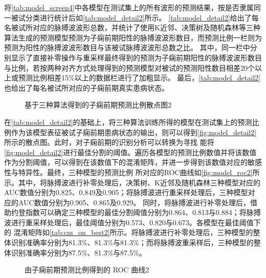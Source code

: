 将\autoref{tab:model_screen4}中各模型在测试集上的所有波形的预测结果，按是否隶属同一被试分类进行统计后如\autoref{tab:model_detail2}所示。
\autoref{tab:model_detail2}给出了每名被试所对应的脉搏波波形总数，并统计了使用K近邻、决策树及随机森林等三种算法生成的预测模型预测为子痫前期阳性的脉搏波波形数目，而预测比例一栏则为预测为阳性的脉搏波波形数目与该被试脉搏波波形总数之比。
其中，同一栏中分别显示了直接补零操作与重采样最终得到的预测为子痫前期阳性的脉搏波波形数目与比例，若按两种对齐方式处理得到的预测模型对被试的预测阳性数目相差20个以上或预测比例相差15\%以上的数据栏进行了加粗显示。
最后，\autoref{tab:model_detail2}也给出了每名被试所对应的子痫前期真实患病状态。

\begin{figure}[htbp]
      \centering
      \quad
      \caption{\label{fig:model_detail2}基于三种算法得到的子痫前期预测比例散点图2}
\end{figure}

在\autoref{tab:model_detail2}的基础上，将三种算法训练所得的模型在测试集上的预测比例作为该模型表征被试子痫前期患病状态的输出，则可以得到\autoref{fig:model_detail2}所示的散点图。此时，对子痫前期的识别分析可以转换为寻找
能将\autoref{fig:model_detail2}进行最佳分割的阈值。遍历各模型的预测比例数值并将该数值作为分割阈值，可以得到在该数值下的混淆矩阵，并进一步得到该数值对应的敏感性与特异性。最终，三种模型的预测比例
所对应的ROC曲线如\autoref{fig:model_roc2}所示。其中，将脉搏波进行补零处理后，决策树、K近邻及随机森林三种模型对应的AUC数值分别为0.825、0.849及0.905；将脉搏波进行重采样处理后，三种模型对应的AUC数值分别为0.905、0.865及0.929。
同时，将脉搏波进行补零处理后，借助约登指数可以确定三种模型的最佳分割阈值分别为0.864、0.813与0.884；将脉搏波进行重采样处理后，最佳阈值分别为0.573、0.820与0.673。各模型在最佳阈值下的
混淆矩阵如\autoref{tab:cm_on_best2}所示。将脉搏波进行补零处理后，三种模型的整体识别准确率分别为81.3\%、81.3\%与81.3\%；而将脉搏波重采样后，三种模型的整体识别准确率分别为87.5\%、81.3\%与87.5\%。

\begin{figure}[htbp]
      \centering
      \quad
      \caption{\label{fig:model_roc2}由子痫前期预测比例得到的 ROC 曲线2}
\end{figure}

